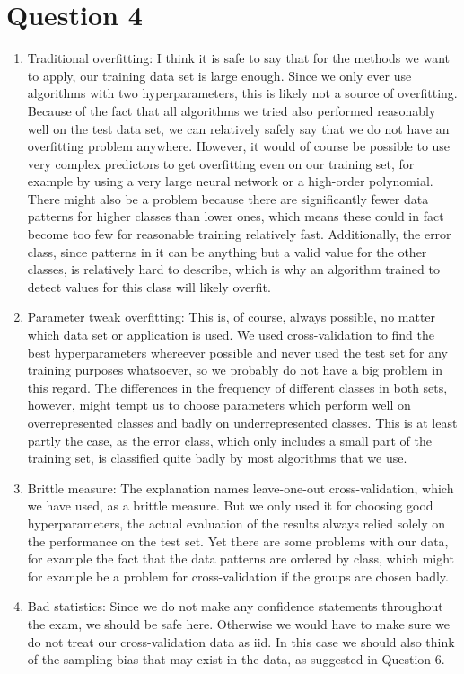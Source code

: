 \documentclass{article}
\begin{document}
\section{Question 4}
\begin{enumerate}
\item Traditional overfitting: I think it is safe to say that for the methods we want to apply, our training data set is large enough. Since we only ever use algorithms with two hyperparameters, this is likely not a source of overfitting. Because of the fact that all algorithms we tried also performed reasonably well on the test data set, we can relatively safely say that we do not have an overfitting problem anywhere. However, it would of course be possible to use very complex predictors to get overfitting even on our training set, for example by using a very large neural network or a high-order polynomial. There might also be a problem because there are significantly fewer data patterns for higher classes than lower ones, which means these could in fact become too few for reasonable training relatively fast. Additionally, the error class, since patterns in it can be anything but a valid value for the other classes, is relatively hard to describe, which is why an algorithm trained to detect values for this class will likely overfit.
\item Parameter tweak overfitting: This is, of course, always possible, no matter which data set or application is used. We used cross-validation to find the best hyperparameters whereever possible and never used the test set for any training purposes whatsoever, so we probably do not have a big problem in this regard. The differences in the frequency of different classes in both sets, however, might tempt us to choose parameters which perform well on overrepresented classes and badly on underrepresented classes. This is at least partly the case, as the error class, which only includes a small part of the training set, is classified quite badly by most algorithms that we use.
\item Brittle measure: The explanation names leave-one-out cross-validation, which we have used, as a brittle measure. But we only used it for choosing good hyperparameters, the actual evaluation of the results always relied solely on the performance on the test set. Yet there are some problems with our data, for example the fact that the data patterns are ordered by class, which might for example be a problem for cross-validation if the groups are chosen badly. 
\item Bad statistics: Since we do not make any confidence statements throughout the exam, we should be safe here. Otherwise we would have to make sure we do not treat our cross-validation data as iid. In this case we should also think of the sampling bias that may exist in the data, as suggested in Question 6.

\end{enumerate}
\end{document}
